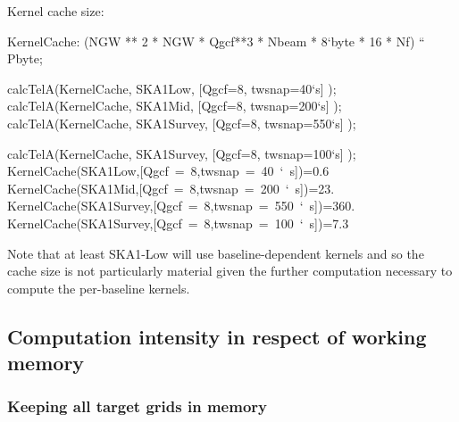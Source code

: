 \documentclass[useAMS,usenatbib,referee]{article}
\begin{document}
Kernel cache size:
\begin{maxima}[]
KernelCache: (NGW ** 2 * NGW * Qgcf**3 * Nbeam * 8`byte * 16 * Nf) `` Pbyte;

calcTelA(KernelCache, SKA1Low,  [Qgcf=8, twsnap=40`s] );
calcTelA(KernelCache, SKA1Mid,  [Qgcf=8, twsnap=200`s] );
calcTelA(KernelCache, SKA1Survey,  [Qgcf=8, twsnap=550`s] );

calcTelA(KernelCache, SKA1Survey,  [Qgcf=8, twsnap=100`s] );
\maximaoutput*
{}\; \\
\m  \mbox{{}KernelCache(SKA1Low,[Qgcf = 8,twsnap = 40 ` s]){}}=0.6 \\
\m  \mbox{{}KernelCache(SKA1Mid,[Qgcf = 8,twsnap = 200 ` s]){}}=23. \\
\m  \mbox{{}KernelCache(SKA1Survey,[Qgcf = 8,twsnap = 550 ` s]){}}=360. \\
\m  \mbox{{}KernelCache(SKA1Survey,[Qgcf = 8,twsnap = 100 ` s]){}}=7.3 \\
\end{maxima}
Note that at least SKA1-Low will use baseline-dependent kernels and so
the cache size is not particularly material given the further
computation necessary to compute the per-baseline kernels.

\subsection{Computation intensity in respect of working memory}

\subsubsection{Keeping all target grids in memory}
\end{document}
